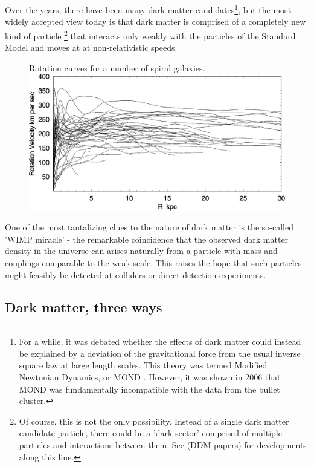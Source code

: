 Over the years, there have been many dark matter candidates\footnote{For a while, it was debated whether the effects of dark matter could instead be explained by a deviation of the gravitational force from the usual inverse square law at large length scales. This theory was termed Modified Newtonian Dynamics, or MOND \citep{Milgrom1983}. However, it was shown in 2006 \citep{Clowe2006} that MOND was fundamentally incompatible with the data from the bullet cluster.}, but the most widely accepted view today is that dark matter is comprised of a completely new kind of particle \footnote{Of course, this is not the only possibility. Instead of a single dark matter candidate particle, there could be a 'dark sector' comprised of multiple particles and interactions between them. See (DDM papers) for developments along this line.} that interacts only weakly with the particles of the Standard Model and moves at at non-relativistic speeds.

\strictpagecheck
\begin{figure}
  \begin{sidecaption}
    {Rotation curves for a number of spiral galaxies. \citep{Sofue2001}}
  \includegraphics[width=\textwidth]{images/rotation_curves}
\end{sidecaption}
\end{figure}
One of the most tantalizing clues to the nature of dark matter is the so-called 'WIMP miracle' - the remarkable coincidence that the observed dark matter density in the universe can arises naturally from a particle with mass and couplings comparable to the weak scale. This raises the hope that such particles might feasibly be detected at colliders or direct detection experiments.

\subsection{Dark matter, three ways}\label{dark-matter-three-ways}

